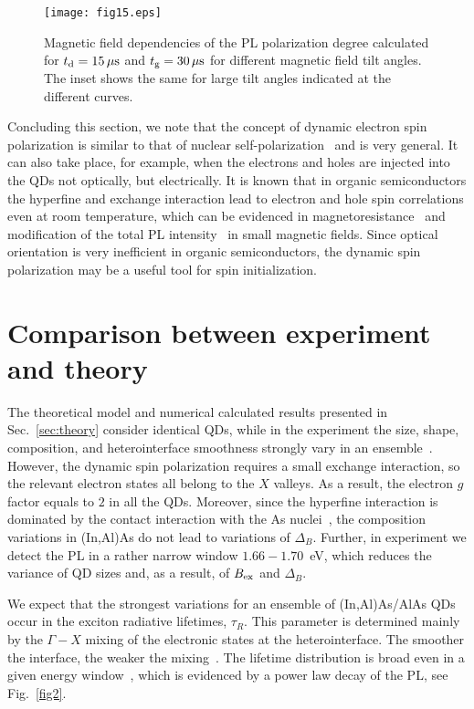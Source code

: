 \documentclass[twocolumn,showpacs,preprintnumbers,amsmath,amssymb,aps]{revtex4-1}
\begin{document}
\begin{figure}[t]
\centering
\texttt{[image: fig15.eps]}
\caption{Magnetic field dependencies of the PL polarization degree
calculated for $t_{\rm d} = 15\,{\rm {\mu}s}$ and $t_{\rm g} =
30\,{\rm \mu s}$ for different magnetic field tilt angles. The inset
shows the same for large tilt angles indicated at the different
curves.} \label{fig15}
\end{figure}

Concluding this section, we note that the concept of dynamic
electron spin polarization is similar to that of nuclear
self-polarization~\cite{self_nuclei} and is very general. It can
also take place, for example, when the electrons and holes are
injected into the QDs not optically, but electrically. It is known
that in organic semiconductors the hyperfine and exchange
interaction lead to electron and hole spin correlations even at room
temperature, which can be evidenced in
magnetoresistance~\cite{OMAR0,OMAR-ASh1,OMAR-ASh2} and modification
of the total PL intensity~\cite{OMAR-Kalin,OMAR-Vard} in small
magnetic fields. Since optical orientation is very inefficient in
organic semiconductors, the dynamic spin polarization may be a
useful tool for spin initialization.

\section{Comparison between experiment and theory}
\label{sec:compare}

The theoretical model and numerical calculated results presented in
Sec.~\ref{sec:theory} consider identical QDs, while in the
experiment the size, shape, composition, and
heterointerface smoothness strongly vary in an
ensemble~\cite{Shamirzaev78,Shamirzaev84}. However, the dynamic spin
polarization requires a small exchange interaction, so the
relevant electron states all belong to the $X$ valleys. As a result, the
electron $g$ factor equals to $2$ in all the QDs. Moreover, since
the hyperfine interaction is dominated by the contact interaction
with the As nuclei~\cite{Kuznetsova}, the composition variations in (In,Al)As do not
lead to variations of $\Delta_B$. Further, in experiment we detect
the PL in a rather narrow window $1.66-1.70$~eV, which reduces the
variance of QD sizes and, as a result, of $B_{\rm ex}$ and
$\Delta_B$.


We expect that the  strongest variations for an ensemble of
(In,Al)As/AlAs QDs occur in the exciton radiative lifetimes,
$\tau_R$. This parameter is determined mainly by the $\Gamma-X$
mixing of the electronic states at the heterointerface. The smoother
the interface, the weaker the mixing~\cite{Shamirzaev84}. The
lifetime distribution is broad even in a given energy
window~\cite{Shamirzaev84,Rautert,Debus,Ivanov97}, which is
evidenced by a power law decay of the PL, see Fig.~\ref{fig2}.
\end{document}
